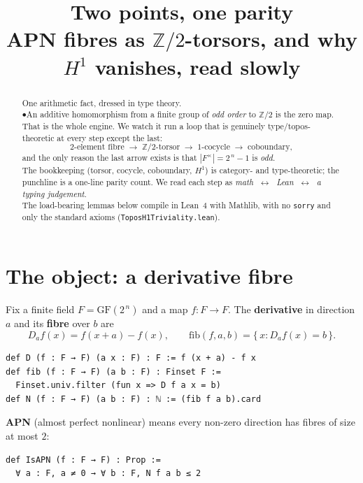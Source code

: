 \documentclass[11pt]{article}
\title{\textbf{Two points, one parity}\\[4pt]
\large APN fibres as $\mathbb{Z}/2$-torsors, and why $H^1$ vanishes, read slowly}
\author{}
\date{}
\begin{document}
\maketitle

\begin{abstract}
\noindent
One arithmetic fact, dressed in type theory.\\[4pt]
$\bullet$\quad An additive homomorphism from a finite group of \emph{odd order}
to $\mathbb{Z}/2$ is the zero map.\\[6pt]
\noindent
That is the whole engine. We watch it run a loop that is genuinely
type/topos-theoretic at every step except the last:
\[
\text{2-element fibre}\;\to\;\mathbb{Z}/2\text{-torsor}\;\to\;\text{1-cocycle}
\;\to\;\text{coboundary},
\]
and the only reason the last arrow exists is that
$|F^\times| = 2^{\,n}-1$ is \emph{odd}.\\[4pt]
The bookkeeping (torsor, cocycle, coboundary, $H^1$) is category- and
type-theoretic; the punchline is a one-line parity count. We read each step as
\emph{math} $\;\leftrightarrow\;$ \emph{Lean} $\;\leftrightarrow\;$ \emph{a
typing judgement}.\\[4pt]
The load-bearing lemmas below compile in Lean~4 with Mathlib, with no
\texttt{sorry} and only the standard axioms
(\texttt{ToposH1Triviality.lean}).
\end{abstract}

\bigskip

\section*{The object: a derivative fibre}

\noindent
Fix a finite field $F=\mathrm{GF}(2^{\,n})$ and a map $f:F\to F$. The
\textbf{derivative} in direction $a$ and its \textbf{fibre} over $b$ are
\[
  D_a f(x) = f(x+a)-f(x),
  \qquad
  \mathrm{fib}(f,a,b)=\{\,x : D_a f(x)=b\,\}.
\]

\begin{lstlisting}
def D (f : F → F) (a x : F) : F := f (x + a) - f x
def fib (f : F → F) (a b : F) : Finset F :=
  Finset.univ.filter (fun x => D f a x = b)
def N (f : F → F) (a b : F) : ℕ := (fib f a b).card
\end{lstlisting}

\noindent
\textbf{APN} (almost perfect nonlinear) means every non-zero direction has
fibres of size at most $2$:

\begin{lstlisting}
def IsAPN (f : F → F) : Prop :=
  ∀ a : F, a ≠ 0 → ∀ b : F, N f a b ≤ 2
\end{lstlisting}
\end{document}
